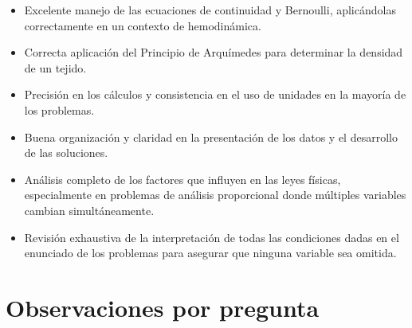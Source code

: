 \documentclass[11pt,a4paper]{article}
\begin{document}
\vspace{4pt}
\begin{minipage}[t]{0.48\linewidth}
  \begin{tcolorbox}[cajaFortaleza, title={Fortalezas}]
\begin{itemize}[leftmargin=1.5em, itemsep=2pt]
  \item Excelente manejo de las ecuaciones de continuidad y Bernoulli, aplicándolas correctamente en un contexto de hemodinámica.
  \item Correcta aplicación del Principio de Arquímedes para determinar la densidad de un tejido.
  \item Precisión en los cálculos y consistencia en el uso de unidades en la mayoría de los problemas.
  \item Buena organización y claridad en la presentación de los datos y el desarrollo de las soluciones.
\end{itemize}
  \end{tcolorbox}
\end{minipage}
\hfill
\begin{minipage}[t]{0.48\linewidth}
  \begin{tcolorbox}[cajaMejora, title={Areas de mejora}]
\begin{itemize}[leftmargin=1.5em, itemsep=2pt]
  \item Análisis completo de los factores que influyen en las leyes físicas, especialmente en problemas de análisis proporcional donde múltiples variables cambian simultáneamente.
  \item Revisión exhaustiva de la interpretación de todas las condiciones dadas en el enunciado de los problemas para asegurar que ninguna variable sea omitida.
\end{itemize}
  \end{tcolorbox}
\end{minipage}

\section*{Observaciones por pregunta}
\end{document}
